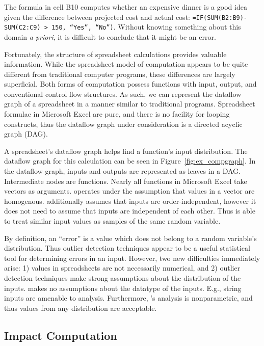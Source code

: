 The formula in cell B10 computes whether an expensive dinner is a good idea given the difference between projected cost and actual cost: \texttt{=IF(SUM(B2:B9)-SUM(C2:C9) > 150, ``Yes'', ``No'')}.  Without knowing something about this domain \emph{a priori}, it is difficult to conclude that it might be an error.

Fortunately, the structure of spreadsheet calculations provides valuable information.  While the spreadsheet model of computation appears to be quite different from traditional computer programs, these differences are largely superficial.  Both forms of computation possess functions with input, output, and conventional control flow structures.  As such, we can represent the dataflow graph of a spreadsheet in a manner similar to traditional programs.  Spreadsheet formulae in Microsoft Excel are pure, and there is no facility for looping constructs, thus the dataflow graph under consideration is a directed acyclic graph (DAG).

A spreadsheet's dataflow graph helps \checkcell{} find a function's input distribution.  The dataflow graph for this calculation can be seen in Figure~\ref{fig:ex_compgraph}.  In the dataflow graph, inputs and outputs are represented as leaves in a DAG.  Intermediate nodes are functions.  Nearly all functions in Microsoft Excel take vectors as arguments.  \checkcell{} operates under the assumption that values in a vector are homogenous.  \checkcell{} additionally assumes that inputs are order-independent, however it does not need to assume that inputs are independent of each other.  Thus \checkcell{} is able to treat similar input values as samples of the same random variable.

By definition, an ``error'' is a value which does not belong to a random variable's distribution.  Thus outlier detection techniques appear to be a useful statistical tool for determining errors in an input.  However, two new difficulties immediately arise: 1) values in spreadsheets are not necessarily numerical, and 2) outlier detection techniques make strong assumptions about the distribution of the inputs.  \checkcell{} makes no assumptions about the datatype of the inputs.  E.g., string inputs are amenable to analysis.  Furthermore, \checkcell{}'s analysis is nonparametric, and thus values from any distribution are acceptable.

\subsection{Impact Computation}

